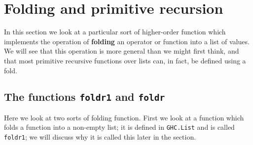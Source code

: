 \section{Folding and primitive recursion}
\label{foldPrimRec}


In this section we look at a particular sort of higher-order function
which implements the operation of \textbf{folding} an operator or function into a
list of values. We will see that this operation is more general than we
might first think, and that most primitive recursive functions over
lists can, in fact, be defined using a fold.

\subsection*{The functions \texttt{foldr1} and \texttt{foldr}}

Here we look at two sorts of folding function. First
we look at a function which folds a function into a non-empty list; it is defined in
\texttt{GHC.List} and is called \texttt{foldr1}; we will discuss why it is 
called this later in the section.

